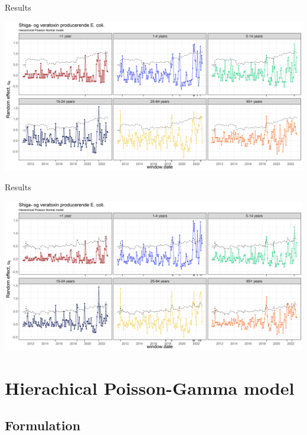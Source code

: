 \documentclass[aspectratio=169]{beamer}
\begin{document}
\begin{frame}{Results}
\protect\hypertarget{results-1}{}
\tiny

\includegraphics[width=1\linewidth]{../figures/windowedSTEDPoisN}

\normalsize
\end{frame}

\begin{frame}{Results}
\protect\hypertarget{results-2}{}
\tiny

\includegraphics[width=1\linewidth]{../figures/windowedSTEDPoisNExclude}

\normalsize
\end{frame}

\hypertarget{hierachical-poisson-gamma-model}{%
\section{Hierachical Poisson-Gamma
model}\label{hierachical-poisson-gamma-model}}

\hypertarget{formulation-1}{%
\subsection{Formulation}\label{formulation-1}}
\end{document}
